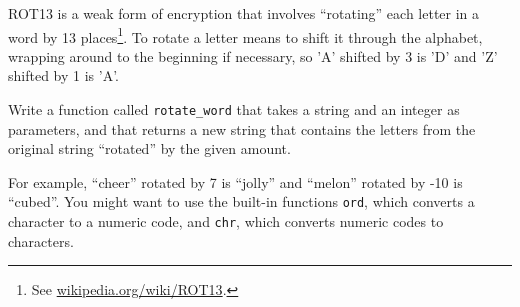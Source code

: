 \begin{exercise}

\label{exrotate}
ROT13 is a weak form of encryption that involves ``rotating'' each
letter in a word by 13 places\footnote{See
  \url{wikipedia.org/wiki/ROT13}.}.  To rotate a letter means
to shift it through the alphabet, wrapping around to the beginning if
necessary, so 'A' shifted by 3 is 'D' and 'Z' shifted by 1 is 'A'.

Write a function called \verb"rotate_word"
that takes a string and an integer as parameters, and that returns
a new string that contains the letters from the original string
``rotated'' by the given amount.  

For example, ``cheer'' rotated by 7 is ``jolly'' and ``melon'' rotated
by -10 is ``cubed''.  
%
%
You might want to use the built-in functions {\tt ord}, which converts
a character to a numeric code, and {\tt chr}, which converts numeric
codes to characters.
%
\end{exercise}
